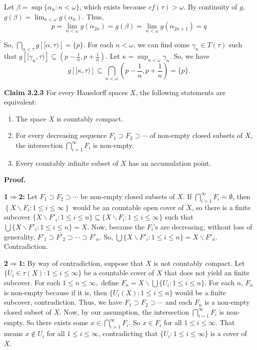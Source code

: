 \documentclass{article}
\begin{document}
Let $\beta=\sup\{\alpha_n: n<\omega\}$, which exists because $cf(\tau)>\omega$. By continuity of $g$, $g(\beta)=\lim_{n<\omega} g(\alpha_n)$. Thus, 
$$p=\lim_{n<\omega} g(\alpha_{2n})=g(\beta)=\lim_{n<\omega} g(\alpha_{2n+1})=q$$

\vskip 10pt

So, $\bigcap_{\alpha<\tau} g\left[[\alpha, \tau)\right]=\{p\}$. For each $n<\omega$, we can find some $\gamma_n\in T(\tau)$ such that $g\left[[\gamma_n,\tau)\right] \subseteq (p-\frac{1}{n}, p+\frac{1}{n}).$ Let $\kappa=\sup_{n<\omega} \gamma_n$. So, we have $$g\left[[\kappa, \tau)\right] \subseteq \bigcap_{n<\omega} (p-\frac{1}{n}, p+\frac{1}{n})=\{p\}.$$ 



\vskip 30pt



\textbf{Claim 3.2.3} For every Hausdorff spaces $X$, the following statements are equivalent: \vskip 5pt
\begin{enumerate}
	\item  The space $X$ is countably compact.
	\item For every decreasing sequence $F_1\supset F_2 \supset \cdots $ of non-empty closed subsets of $X$, the intersection $\bigcap_{i=1}^{\infty} F_i$ is non-empty. 
	\item Every countably infinite subset of $X$ has an accumulation point. 
\end{enumerate}
\vskip 15pt
\textbf{Proof.} \vskip 10pt

\textbf{1$\Rightarrow $2:} Let $F_1\supset F_2 \supset \cdots $ be non-empty closed subsets of $X$. If $\bigcap_{i=1}^{\infty} F_i =\emptyset$, then $\left\{X\backslash F_i : 1\leq i \leq \infty\right\} $ would be an countable open cover of $X$, so there is a finite subcover $\{X\backslash F'_i : 1\leq i \leq n\} \subseteq \{X\backslash F_i : 1\leq i \leq \infty\}$ such that $\bigcup \{X\backslash F'_i : 1\leq i \leq n\}= X$. Now, because the $F_i$'s are decreasing, without loss of generality, $F'_1 \supset F'_2 \supset \cdots \supset F'_n$. So, $\bigcup \{X\backslash F'_i : 1\leq i \leq n\}= X\backslash F'_n$. Contradiction.


\vskip 10pt

\textbf{2$\Rightarrow $1:} By way of contradiction, suppose that $X$ is not countably compact.
Let $\{U_i\in \tau(X): 1\leq i\leq \infty\}$ be a countable cover of $X$ that does not yield an finite subcover. For each $1\leq n\leq \infty,$ define $F_n=X\backslash \bigcup\{U_i: 1\leq i\leq n\}.$ For each $n$, $F_n$ is non-empty because if it is, then $\{U_i(X): 1\leq i\leq n\}$ would be a finite subcover, contradiction. Thus, we have $F_1\supset F_2 \supset \cdots $ and each $F_n$ is a non-empty closed subset of $X$. 
\vskip 10pt
Now, by our assumption, the intersection $\bigcap_{i=1}^{\infty} F_i$ is non-empty. So there exists some $x\in \bigcap_{i=1}^{\infty} F_i$. So $x\in F_i$ for all $1\leq i\leq \infty$. That means $x\notin U_i$ for all $1\leq i\leq \infty$, contradicting that $\{U_i: 1\leq i\leq \infty\}$ is a cover of $X$. 
\end{document}
